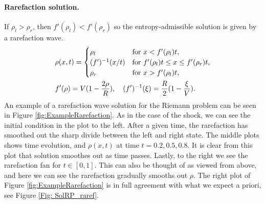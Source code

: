 \documentclass[10pt]{article}
\numberwithin{equation}{section}
\begin{document}
\paragraph{Rarefaction solution.} If $\rho_l > \rho_r$, then $f'(\rho_l) < f'(\rho_r) $ so the entropy-admissible solution is given by a rarefaction wave.
\begin{align}
    & \rho(x,t) = \begin{cases}
    \rho_l & \text{for $x < f'(\rho_l)t$, } \\
    (f')^{-1}(x/t)  &  \text{for $ f'(\rho_l)t \leq x \leq f'(\rho_r)t$,} \\
     \rho_r & \text{for $x > f'(\rho_l)t$, }
    \end{cases} \nonumber \\
    & f'(\rho) = V(1-\frac{2 \rho}{R}) , \quad  (f')^{-1}(\xi) = \frac{R}{2}(1-\frac{\xi}{V}).
    \label{Eq:CharacteristicSpeed}
\end{align}
An example of a rarefaction wave solution for the Riemann problem can be seen in Figure \ref{fig:ExampleRarefaction}. As in the case of the shock, we can see the initial condition in the plot to the left. After a given time, the rarefaction has smoothed out the sharp divide between the left and right state. The middle plots shows time evolution, and $\rho(x,t)$ at time $t = 0.2, 0.5, 0.8$. It is clear from this plot that solution smoothes out as time passes. Lastly, to the right we see the rarefaction fan for $t \in [0,1]$. This can also be thought of as viewed from above, and here we can see the rarefaction gradually smooths out $\rho$. The right plot of Figure \ref{fig:ExampleRarefaction} is in full agreement with what we expect a priori, see Figure \ref{Fig: SolRP_raref}.
\end{document}
